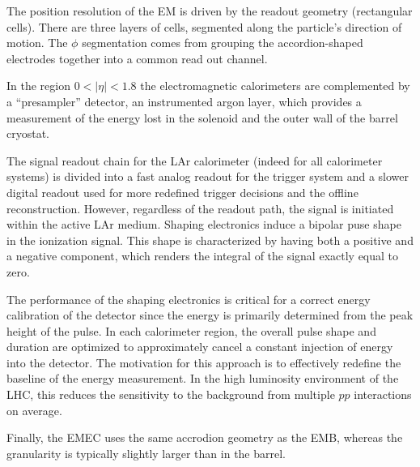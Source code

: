 The position resolution of the EM is driven by the readout geometry (rectangular cells). There are three layers of cells, segmented along the particle's direction of motion.  The $\phi$ segmentation comes from grouping the accordion-shaped electrodes together into a common read out channel. 

In the region $0 <|\eta| < 1.8$ the electromagnetic calorimeters are complemented by a ``presampler'' detector, an instrumented argon layer, which provides a measurement of the energy lost in the solenoid and the outer wall of the barrel cryostat.

The signal readout chain for the LAr calorimeter (indeed for all calorimeter systems) is divided into a fast analog readout for the trigger system and a slower digital readout used for more redefined trigger decisions and the offline reconstruction. However, regardless of the readout path, the signal is initiated within the active LAr medium.  Shaping electronics induce a bipolar puse shape in the ionization signal. This shape is characterized by having both a positive and a negative component, which renders the integral of the signal exactly equal to zero.

The performance of the shaping electronics is critical for a correct energy calibration of the detector since the energy is primarily determined from the peak height of the pulse. %
In each calorimeter region, the overall pulse shape and duration are optimized to approximately cancel a constant injection of energy into the detector. The motivation for this approach is to effectively redefine the baseline of the energy measurement. In the high luminosity environment of the LHC, this reduces the sensitivity to the background from multiple $pp$ interactions on average.

Finally, the EMEC uses the same accrodion geometry as the EMB, whereas the granularity is typically slightly larger than in the barrel.


